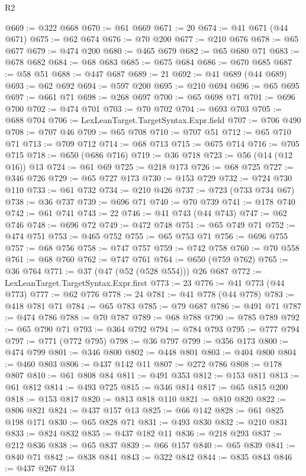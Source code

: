 \begin{lexlean}{R2}
\begin{coremodule}
@669 := @322 @668
@670 := @61 @669
@671 := 20
@674 := @41 @671 (@44 @671)
@675 := @62 @674
@676 := @70 @200
@677 := @210 @676
@678 := @65 @677
@679 := @474 @200
@680 := @465 @679
@682 := @65 @680 @71
@683 := @678 @682
@684 := @68 @683
@685 := @675 @684
@686 := @670 @685
@687 := @58 @51
@688 := @447 @687
@689 := 21
@692 := @41 @689 (@44 @689)
@693 := @62 @692
@694 := @597 @200
@695 := @210 @694
@696 := @65 @695
@697 := @661 @71
@698 := @268 @697
@700 := @65 @698 @71
@701 := @696 @700
@702 := @474 @701
@703 := @70 @702
@704 := @693 @703
@705 := @688 @704
@706 := LexLeanTarget.TargetSyntax.Expr.field
@707 := @706 @490
@708 := @707 @46
@709 := @65 @708
@710 := @707 @51
@712 := @65 @710 @71
@713 := @709 @712
@714 := @68 @713
@715 := @675 @714
@716 := @705 @715
@718 := @650 (@686 @716)
@719 := @36 @718
@723 := @56 (@14 (@12 @16)) @13
@724 := @61 @69
@725 := @218 @173
@726 := @68 @725
@727 := @346 @726
@729 := @65 @727 @173
@730 := @153 @729
@732 := @724 @730 @110
@733 := @61 @732
@734 := @210 @426
@737 := @723 (@733 @734 @67)
@738 := @36 @737
@739 := @696 @71
@740 := @70 @739
@741 := @178 @740
@742 := @61 @741
@743 := 22
@746 := @41 @743 (@44 @743)
@747 := @62 @746
@748 := @696 @72
@749 := @472 @748
@751 := @65 @749 @71
@752 := @474 @751
@753 := @465 @752
@755 := @65 @753 @71
@756 := @696 @755
@757 := @68 @756
@758 := @747 @757
@759 := @742 @758
@760 := @70 @558
@761 := @68 @760
@762 := @747 @761
@764 := @650 (@759 @762)
@765 := @36 @764
@771 := @37 (@47 (@52 (@528 @554))) @26 @687
@772 := LexLeanTarget.TargetSyntax.Expr.first
@773 := 23
@776 := @41 @773 (@44 @773)
@777 := @62 @776
@778 := 24
@781 := @41 @778 (@44 @778)
@783 := @418 @781 @71
@784 := @65 @783
@785 := @79 @687
@786 := @491 @71
@787 := @474 @786
@788 := @70 @787
@789 := @68 @788
@790 := @785 @789
@792 := @65 @790 @71
@793 := @364 @792
@794 := @784 @793
@795 := @777 @794
@797 := @771 (@772 @795)
@798 := @36 @797
@799 := @356 @173
@800 := @474 @799
@801 := @346 @800
@802 := @448 @801
@803 := @404 @800
@804 := @460 @803
@806 := @437 @142 @11
@807 := @272 @786
@808 := @178 @807
@810 := @61 @808 @84
@811 := @491 @353
@812 := @153 @811
@813 := @61 @812
@814 := @493 @725
@815 := @346 @814
@817 := @65 @815 @200
@818 := @153 @817
@820 := @813 @818 @110
@821 := @810 @820
@822 := @806 @821
@824 := @437 @157 @13
@825 := @66 @142
@828 := @61 @825 @198 @171
@830 := @65 @828 @71
@831 := @493 @830
@832 := @210 @831
@833 := @824 @832
@835 := @437 @182 @11
@836 := @218 @293
@837 := @212 @836
@838 := @65 @837
@839 := @66 @157
@840 := @65 @839
@841 := @840 @71
@842 := @838 @841
@843 := @322 @842
@844 := @835 @843
@846 := @437 @267 @13

\end{coremodule}
\end{lexlean}
